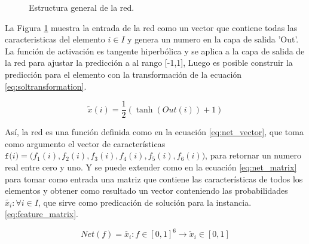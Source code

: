 \documentclass[spanish, a4paper, 12pt, openany,final]{book}
\begin{document}
\begin{figure}[H]
		\caption{Estructura general de la red.}
		\label{fig:network}
	\end{figure}


La Figura \ref{fig:network} muestra la entrada de la red como un vector que contiene todas las caracteristicas del elemento $i \in I$ y genera un numero en la capa de salida 'Out'. La función de activación es tangente hiperbólica y se aplica a la capa de salida de la red para ajustar la predicción a al rango [-1,1], Luego es posible construir la predicción para el elemento con la  transformación de la ecuación \eqref{eq:soltransformation}. 


\begin{equation}
	\tilde{x}(i) = \frac{1}{2}\left( \tanh(Out(i)) + 1 \right)
	\label{eq:soltransformation}	
\end{equation}


Así, la red es una función definida como en la ecuación \eqref{eq:net_vector}, que toma como argumento el vector de características $\texttt{f($i$)} = \textbf{(}f_1(i),f_2(i),f_3(i),f_4(i),f_5(i),f_6(i)\textbf{)}$, para retornar un numero real entre cero y uno. Y se puede extender como en la ecuación \eqref{eq:net_matrix} para tomar como entrada una matriz que contiene las características de todos los elementos y obtener como resultado un vector conteniendo las probabilidades $\tilde{x_i} :\forall i \in I$, que sirve como predicación de solución para la instancia. \eqref{eq:feature_matrix}.

\begin{equation}
	\label{eq:net_vector}
	Net(f) = \tilde{x_i}: f\in [0,1]^6 \rightarrow \tilde{x}_i \in[0,1]
\end{equation}
\end{document}
